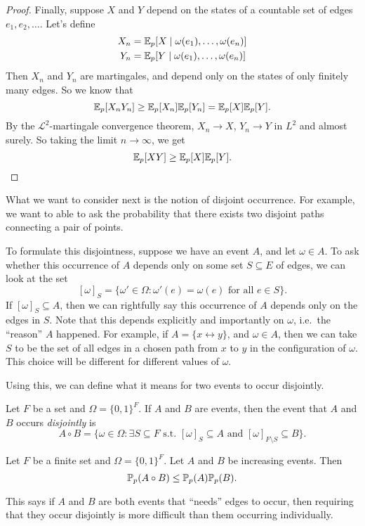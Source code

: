 \documentclass[a4paper]{article}
\begin{document}
\begin{proof}
  Finally, suppose $X$ and $Y$ depend on the states of a countable set of edges $e_1, e_2, \ldots$. Let's define
  \begin{align*}
    X_n &= \E_p [X \mid \omega(e_1), \ldots, \omega(e_n)]\\
    Y_n &= \E_p [Y \mid \omega(e_1), \ldots, \omega(e_n)]
  \end{align*}
  Then $X_n$ and $Y_n$ are martingales, and depend only on the states of only finitely many edges. So we know that
  \[
    \E_p[X_n Y_n] \geq \E_p [X_n] \E_p[Y_n] = \E_p[X] \E_p[Y].
  \]
  By the $\mathcal{L}^2$-martingale convergence theorem, $X_n \to X$, $Y_n \to Y$ in $L^2$ and almost surely. So taking the limit $n \to \infty$, we get
  \[
    \E_p[XY] \geq \E_p[X] \E_p[Y].\qedhere
  \]
\end{proof}

What we want to consider next is the notion of disjoint occurrence. For example, we want to able to ask the probability that there exists two disjoint paths connecting a pair of points.

To formulate this disjointness, suppose we have an event $A$, and let $\omega \in A$. To ask whether this occurrence of $A$ depends only on some set $S \subseteq E$ of edges, we can look at the set
\[
  [\omega]_S = \{\omega' \in \Omega: \omega'(e) = \omega(e)\text{ for all }e \in S\}.
\]
If $[\omega]_S \subseteq A$, then we can rightfully say this occurrence of $A$ depends only on the edges in $S$. Note that this depends explicitly and importantly on $\omega$, i.e.\ the ``reason'' $A$ happened. For example, if $A = \{x \leftrightarrow y\}$, and $\omega \in A$, then we can take $S$ to be the set of all edges in a chosen path from $x$ to $y$ in the configuration of $\omega$. This choice will be different for different values of $\omega$.

Using this, we can define what it means for two events to occur disjointly.
\begin{defi}
  Let $F$ be a set and $\Omega = \{0, 1\}^F$. If $A$ and $B$ are events, then the event that $A$ and $B$ occurs \emph{disjointly} is
  \[
    A \circ B = \{\omega \in \Omega : \exists S \subseteq F\text{ s.t. } [\omega]_S \subseteq A \text{ and } [\omega]_{F\setminus S} \subseteq B\}.
  \]
\end{defi}

\begin{thm}[BK inequality] %
  Let $F$ be a finite set and $\Omega = \{0, 1\}^F$. Let $A$ and $B$ be increasing events. Then
  \[
    \P_p(A \circ B) \leq \P_p(A) \P_p(B).
  \]
\end{thm}
This says if $A$ and $B$ are both events that ``needs'' edges to occur, then requiring that they occur disjointly is more difficult than them occurring individually.
\end{document}
